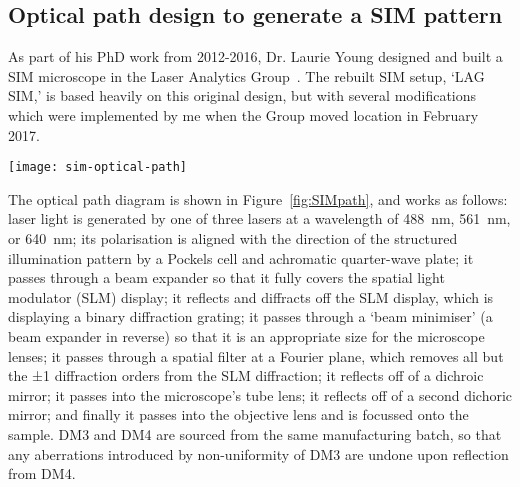 \subsection{Optical path design to generate a SIM pattern} \label{sec:lagsim-path}
As part of his PhD work from 2012-2016, Dr. Laurie Young designed and built a SIM microscope in the Laser Analytics Group~\cite{young2016guide}.
The rebuilt SIM setup, `LAG SIM,' is based heavily on this original design, but with several modifications which were implemented by me when the Group moved location in February 2017.

\begin{sidewaysfigure}[p]
\centering
\texttt{[image: sim-optical-path]}
\caption[LAG SIM: Various optics work together to pattern the laser light with a SIM pattern and apply polarisation rotation for optical sectioning and resolution enhancement]{The optical layout of the SIM aligns light from one of 3 lasers onto an optical path. The light passes through a Pockels cell and quarter wave plate for polarisation rotation, before a square-wave pattern is applied by a spatial light modulator. The patterned light is passed through a spatial mask in the Fourier plane to produce a sinusoidal pattern, which is relayed onto the sample. The objective lens collects fluorescent emission light,  which is filtered to remove any reflected excitation light before reaching the sCMOS camera.}
\label{fig:SIMpath}
\end{sidewaysfigure}

The optical path diagram is shown in Figure~\ref{fig:SIMpath}, and works as follows: laser light is generated by one of three lasers at a wavelength of \SI{488}{\nano\metre}, \SI{561}{\nano\metre}, or \SI{640}{\nano\metre}; its polarisation is aligned with the direction of the structured illumination pattern by a Pockels cell and achromatic quarter-wave plate; it passes through a beam expander so that it fully covers the spatial light modulator (SLM) display; it reflects and diffracts off the SLM display, which is displaying a binary diffraction grating; it passes through a `beam minimiser' (a beam expander in reverse) so that it is an appropriate size for the microscope lenses; it passes through a spatial filter at a Fourier plane, which removes all but the ±1 diffraction orders from the SLM diffraction; it reflects off of a dichroic mirror; it passes into the microscope's tube lens; it reflects off of a second dichoric mirror; and finally it passes into the objective lens and is focussed onto the sample.
DM3 and DM4 are sourced from the same manufacturing batch, so that any aberrations introduced by non-uniformity of DM3 are undone upon reflection from DM4.

